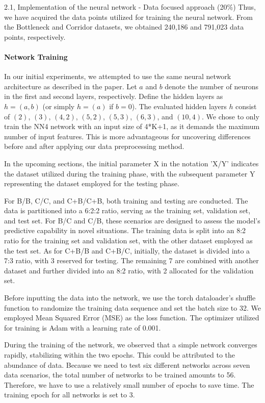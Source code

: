 \begin{task}{2.1, Implementation of the neural network - Data focused approach (20\%)}
Thus, we have acquired the data points utilized for training the neural network. From the Bottleneck and Corridor datasets, we obtained 240,186 and 791,023 data points, respectively.

\paragraph{Network Training}

In our initial experiments, we attempted to use the same neural network architecture as described in the paper. Let \(a\) and \(b\) denote the number of neurons in the first and second layers, respectively. Define the hidden layers as \(h = (a, b)\) (or simply \(h = (a)\) if \(b = 0\)). The evaluated hidden layers \(h\) consist of \((2)\), \((3)\), \((4, 2)\), \((5, 2)\), \((5, 3)\), \((6, 3)\), and \((10, 4)\). We chose to only train the NN4 network with an input size of 4*K+1, as it demands the maximum number of input features. This is more advantageous for uncovering differences before and after applying our data preprocessing method.


In the upcoming sections, the initial parameter X in the notation 'X/Y' indicates the dataset utilized during the training phase, with the subsequent parameter Y representing the dataset employed for the testing phase.

For B/B, C/C, and C+B/C+B, both training and testing are conducted. The data is partitioned into a 6:2:2 ratio, serving as the training set, validation set, and test set. For B/C and C/B, these scenarios are designed to assess the model's predictive capability in novel situations. The training data is split into an 8:2 ratio for the training set and validation set, with the other dataset employed as the test set. As for C+B/B and C+B/C, initially, the dataset is divided into a 7:3 ratio, with 3 reserved for testing. The remaining 7 are combined with another dataset and further divided into an 8:2 ratio, with 2 allocated for the validation set.

Before inputting the data into the network, we use the torch dataloader's shuffle function to randomize the training data sequence and set the batch size to 32. We employed Mean Squared Error (MSE) as the loss function. The optimizer utilized for training is Adam with a learning rate of 0.001.

During the training of the network, we observed that a simple network converges rapidly, stabilizing within the two epochs. This could be attributed to the abundance of data. Because we need to test six different networks across seven data scenarios, the total number of networks to be trained amounts to 56. Therefore, we have to use a relatively small number of epochs to save time. The training epoch for all networks is set to 3.


\end{task}
